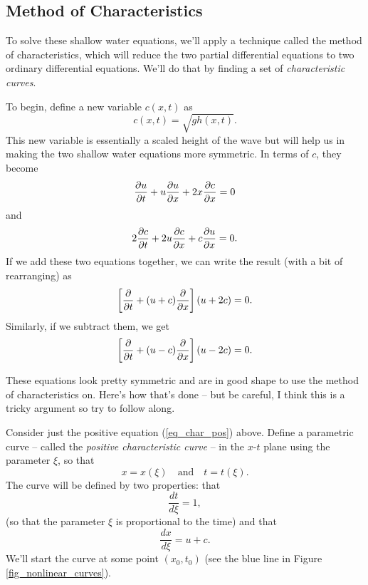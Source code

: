 \subsection{Method of Characteristics}

To solve these shallow water equations, we'll apply a technique called the method of characteristics, which will reduce the two partial differential equations to two ordinary differential equations.  We'll do that by finding a set of \emph{characteristic curves}.

To begin, define a new variable $c(x, t)$ as
\begin{equation}
c(x, t) = \sqrt{gh(x, t)}.
\end{equation}
This new variable is essentially a scaled height of the wave but will help us in making the two shallow water equations more symmetric.  In terms of $c$, they become
\begin{equation}
\frac{\partial {u}}{\partial {t}} + u\frac{\partial {u}}{\partial {x}} + 2x \frac{\partial {c}}{\partial {x}} = 0
\end{equation}
and
\begin{equation}
2\frac{\partial {c}}{\partial {t}} + 2u\frac{\partial {c}}{\partial {x}} + c \frac{\partial {u}}{\partial {x}} = 0.
\end{equation}
If we add these two equations together, we can write the result (with a bit of rearranging) as
\begin{equation}
\label{eq_char_pos}
\left[ \frac{\partial {}}{\partial {t}} + (u + c) \frac{\partial {}}{\partial {x}} \right] (u + 2c) = 0.
\end{equation}
Similarly, if we subtract them, we get
\begin{equation}
\label{eq_char_neg}
\left[ \frac{\partial {}}{\partial {t}} + (u - c) \frac{\partial {}}{\partial {x}} \right] (u - 2c) = 0.
\end{equation}

These equations look pretty symmetric and are in good shape to use the method of characteristics on.  Here's how that's done -- but be careful, I think this is a tricky argument so try to follow along.

Consider just the positive equation (\ref{eq_char_pos}) above.  Define a parametric curve -- called the \emph{positive characteristic curve} -- in the $x$-$t$ plane using the parameter $\xi$, so that
\[
x = x(\xi) \quad \text{and} \quad t = t(\xi).
\]
The curve will be defined by two properties:  that 
\[
\frac{dt}{d\xi} = 1,
\]
(so that the parameter $\xi$ is proportional to the time) and that
\[
\frac{dx}{d\xi} = u+c.
\]
We'll start the curve at some point $(x_0, t_0)$ (see the blue line in Figure \ref{fig_nonlinear_curves}).

